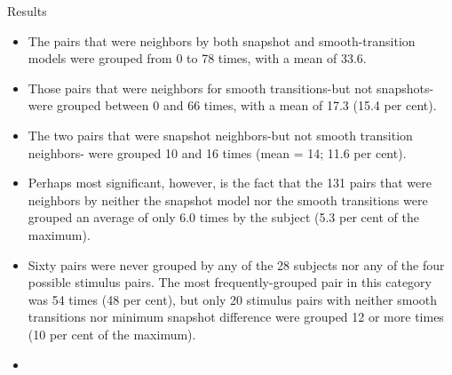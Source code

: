 \begin{frame}{Results}
	\begin{itemize}
		\item The pairs that were neighbors by both snapshot and smooth-transition models were grouped from 0 to 78 times, with a mean of 33.6.
		
		\item Those pairs that were neighbors for smooth transitions-but not snapshots- were grouped between 0 and 66 times, with a mean of 17.3 (15.4 per cent).
		
		\item The two pairs that were snapshot neighbors-but not smooth transition neighbors- were grouped 10 and 16 times (mean = 14; 11.6 per cent).
		
		\item Perhaps most significant, however, is the fact that the 131 pairs that were neighbors by neither the snapshot model nor the smooth transitions were grouped an average of only 6.0 times by the subject (5.3 per cent of the maximum).
		
		\item Sixty pairs were never grouped by any of the 28 subjects nor any of the four possible stimulus pairs. The most frequently-grouped pair in this category was 54 times (48 per cent), but only 20 stimulus pairs with neither smooth transitions nor minimum snapshot difference were grouped 12 or more times (10 per cent of the maximum).
		
		\item 
	\end{itemize}
	
\end{frame}
